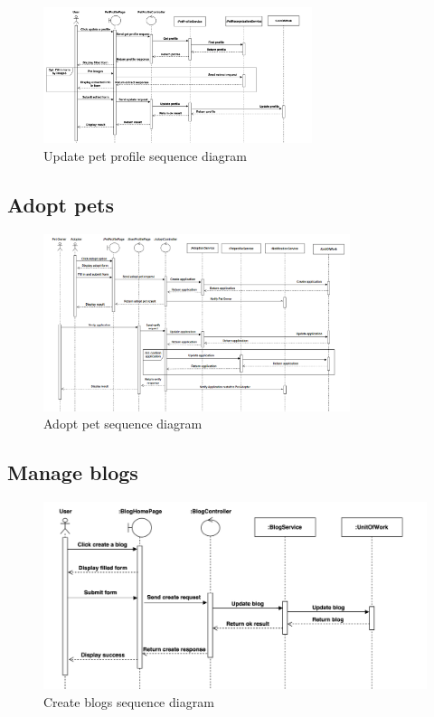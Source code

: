 \begin{figure}[H]
    \centering
    \includegraphics[angle=-90,width=0.7\textwidth]{Figures/update_pet_profile_seq.png}
    \caption{Update pet profile sequence diagram}
    \label{fig:update-pet-seq}
\end{figure}
\clearpage

\subsection{Adopt pets}
\begin{figure}[H]
    \centering
    \includegraphics[angle=-90,width=0.8\textwidth]{Figures/adopt_pet_seq.png}
    \caption{Adopt pet sequence diagram}
    \label{fig:adopt-pet-seq}
\end{figure}
\clearpage

\subsection{Manage blogs}

\begin{figure}[H]
    \centering
    \includegraphics[width=1\textwidth]{Figures/manage_blog_seq.png}
    \caption{Create blogs sequence diagram}
    \label{fig:manage-blog-seq}
\end{figure}

